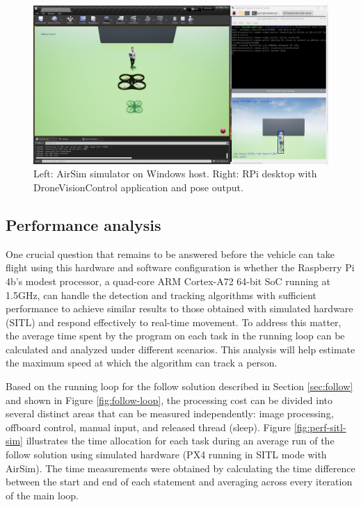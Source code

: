 \begin{figure}
  \centering
  \includegraphics[width=\textwidth, keepaspectratio]{img/airsim-rpi-test.png}
  \caption{Left: AirSim simulator on Windows host. Right: RPi desktop with DroneVisionControl application and pose output.}
  \label{fig:rpi-airsim-test}
\end{figure}




\subsection{Performance analysis}
\label{subsec:performance}

One crucial question that remains to be answered before the vehicle can take flight using this hardware and software configuration is whether the Raspberry Pi 4b's modest processor, a quad-core ARM Cortex-A72 64-bit SoC running at 1.5GHz, can handle the detection and tracking algorithms with sufficient performance to achieve similar results to those obtained with simulated hardware (SITL) and respond effectively to real-time movement. To address this matter, the average time spent by the program on each task in the running loop can be calculated and analyzed under different scenarios. This analysis will help estimate the maximum speed at which the algorithm can track a person.


Based on the running loop for the follow solution described in Section \ref{sec:follow} and shown in Figure \ref{fig:follow-loop}, the processing cost can be divided into several distinct areas that can be measured independently: image processing, offboard control, manual input, and released thread (sleep). Figure \ref{fig:perf-sitl-sim} illustrates the time allocation for each task during an average run of the follow solution using simulated hardware (PX4 running in SITL mode with AirSim). The time measurements were obtained by calculating the time difference between the start and end of each statement and averaging across every iteration of the main loop.

